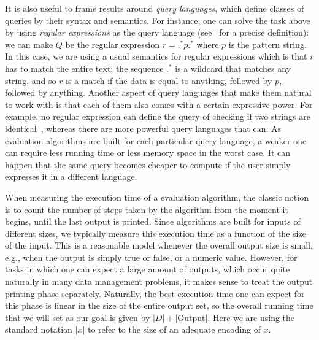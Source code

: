 It is also useful to frame results around {\it query languages}, which define classes of queries by their syntax and semantics. For instance, one can solve the task above by using {\it regular expressions} as the query language (see~\cite{automatahandbook} for a precise definition): we can make $Q$ be the regular expression $r = \texttt{.}^\texttt{*}p\texttt{.}^\texttt{*}$ where $p$ is the pattern string. In this case, we are using a usual semantics for regular expressions which is that $r$ has to match the entire text; the sequence $\texttt{.}^\texttt{*}$ is a wildcard that matches any string, and so $r$ is a match if the data is equal to anything, followed by $p$, followed by anything. Another aspect of query languages that make them natural to work with is that each of them also comes with a certain expressive power. For example, no regular expression can define the query of checking if two strings are identical~\cite{automatahandbook}, whereas there are more powerful query languages that can. As evaluation algorithms are built for each particular query language, a weaker one can require less running time or less memory space in the worst case. It can happen that the same query becomes cheaper to compute if the user simply expresses it in a different language. 

When measuring the execution time of a evaluation algorithm, the classic notion is to count the number of steps taken by the algorithm from the moment it begins, until the last output is printed. Since algorithms are built for inputs of different sizes, we typically measure this execution time as a function of the size of the input.
This is a reasonable model whenever the overall output size is small, e.g., when the output is simply true or false, or a numeric value. However, for tasks in which one can expect a large amount of outputs, which occur quite naturally in many data management problems, it makes sense to treat the output printing phase separately. Naturally, the best execution time one can expect for this phase is linear in the size of the entire output set, so the overall running time that we will set as our goal is given by $|D| + |\text{Output}|$. Here we are using the standard notation $|x|$ to refer to the size of an adequate encoding of $x$.

